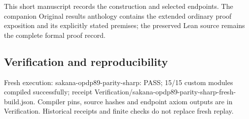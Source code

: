 \documentclass[11pt,a4paper]{article}
\begin{document}
{\small This short manuscript records the construction and selected endpoints. The companion Original results anthology contains the extended ordinary proof exposition and its explicitly stated premises; the preserved Lean source remains the complete formal proof record.\par}

\subsection{Verification and reproducibility}
Fresh execution: sakana-opdp89-parity-sharp: PASS; 15/15 custom modules compiled successfully; receipt Verification/sakana-opdp89-parity-sharp-fresh-build.json. Compiler pins, source hashes and endpoint axiom outputs are in Verification. Historical receipts and finite checks do not replace fresh replay.
\end{document}
